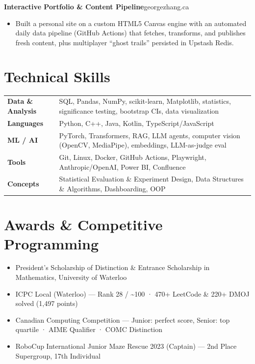 \documentclass[letterpaper,11pt]{article}
\newcommand{\project}[3]{%
  \textbf{#1}\enspace{\small\textcolor{accent!55}{\textbar}\enspace #2}\hfill{\small #3}\par%
}
\newenvironment{bullets}
  {\begin{itemize}[leftmargin=1.5em,labelsep=0.5em,itemsep=1pt,topsep=1pt,parsep=0pt,partopsep=0pt]\small}
  {\end{itemize}\vspace{1pt}}
\begin{document}
\project{Interactive Portfolio \& Content Pipeline}{TypeScript, Next.js, Redis}{georgezhang.ca}
\begin{bullets}
  \item Built a personal site on a custom HTML5 Canvas engine with an automated daily data pipeline (GitHub Actions) that fetches, transforms, and publishes fresh content, plus multiplayer ``ghost trails'' persisted in Upstash Redis.
\end{bullets}

\section{Technical Skills}
\begin{tabularx}{\textwidth}{@{}l X@{}}
  \textbf{Data \& Analysis} & SQL, Pandas, NumPy, scikit-learn, Matplotlib, statistics, significance testing, bootstrap CIs, data visualization\\
  \textbf{Languages} & Python, C++, Java, Kotlin, TypeScript/JavaScript\\
  \textbf{ML / AI} & PyTorch, Transformers, RAG, LLM agents, computer vision (OpenCV, MediaPipe), embeddings, LLM-as-judge eval\\
  \textbf{Tools} & Git, Linux, Docker, GitHub Actions, Playwright, Anthropic/OpenAI, Power BI, Confluence\\
  \textbf{Concepts} & Statistical Evaluation \& Experiment Design, Data Structures \& Algorithms, Dashboarding, OOP\\
\end{tabularx}

\section{Awards \& Competitive Programming}
\begin{bullets}
  \item President's Scholarship of Distinction \& Entrance Scholarship in Mathematics, University of Waterloo
  \item ICPC Local (Waterloo) --- Rank 28 / \textasciitilde100 · 470+ LeetCode \& 220+ DMOJ solved (1{,}497 points)
  \item Canadian Computing Competition --- Junior: perfect score, Senior: top quartile · AIME Qualifier · COMC Distinction
  \item RoboCup International Junior Maze Rescue 2023 (Captain) --- 2nd Place Supergroup, 17th Individual
\end{bullets}
\end{document}
